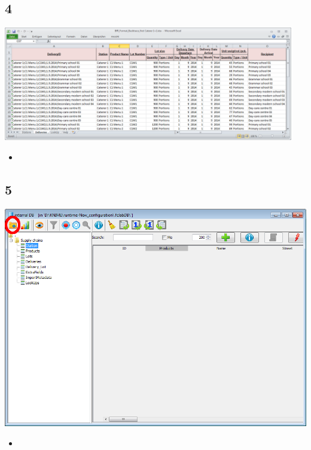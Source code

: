\documentclass{beamer}
\begin{document}
\subsection{4}
\begin{frame}
	\begin{center}
  		\includegraphics[width=0.95\textwidth]{4.png}
	\end{center}
	\begin{itemize}
		\item
	\end{itemize}
\end{frame}

\subsection{5}
\begin{frame}
	\begin{center}
  		\includegraphics[height=0.6\textheight]{5.png}
	\end{center}
	\begin{itemize}
		\item
	\end{itemize}
\end{frame}
\end{document}
